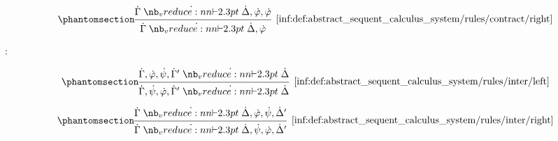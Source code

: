 \begin{definition}
\begin{thmenum}
\begin{paracol}{2}
      \begin{rightcolumn}
        \ParacolAlignmentHack
        \begin{equation*}\taglabel[\ensuremath{ \logic{Contr}_R }]{inf:def:abstract_sequent_calculus_system/rules/contract/right}
          \begin{prooftree}
            \hypo{ \syn\Gamma \synvdash \syn\Delta, \syn\varphi, \syn\varphi }
            \infer1[\ref{inf:def:abstract_sequent_calculus_system/rules/contract/right}]{ \syn\Gamma \synvdash \syn\Delta, \syn\varphi }
          \end{prooftree}
        \end{equation*}
      \end{rightcolumn}
    \end{paracol}

     :
    \begin{paracol}{2}
      \begin{leftcolumn}
        \ParacolAlignmentHack
        \begin{equation*}\taglabel[\ensuremath{ \logic{Inter}_L }]{inf:def:abstract_sequent_calculus_system/rules/inter/left}
          \begin{prooftree}
            \hypo{ \syn\Gamma, \syn\varphi, \syn\psi, \syn\Gamma' \synvdash \syn\Delta }
            \infer1[\ref{inf:def:abstract_sequent_calculus_system/rules/inter/left}]{ \syn\Gamma, \syn\psi, \syn\varphi, \syn\Gamma' \synvdash \syn\Delta }
          \end{prooftree}
        \end{equation*}
      \end{leftcolumn}

      \begin{rightcolumn}
        \ParacolAlignmentHack
        \begin{equation*}\taglabel[\ensuremath{ \logic{Inter}_R }]{inf:def:abstract_sequent_calculus_system/rules/inter/right}
          \begin{prooftree}
            \hypo{ \syn\Gamma \synvdash \syn\Delta, \syn\varphi, \syn\psi, \syn\Delta' }
            \infer1[\ref{inf:def:abstract_sequent_calculus_system/rules/inter/right}]{ \syn\Gamma \synvdash \syn\Delta, \syn\psi, \syn\varphi, \syn\Delta' }
          \end{prooftree}
        \end{equation*}
      \end{rightcolumn}
    \end{paracol}


\end{thmenum}
\end{definition}

